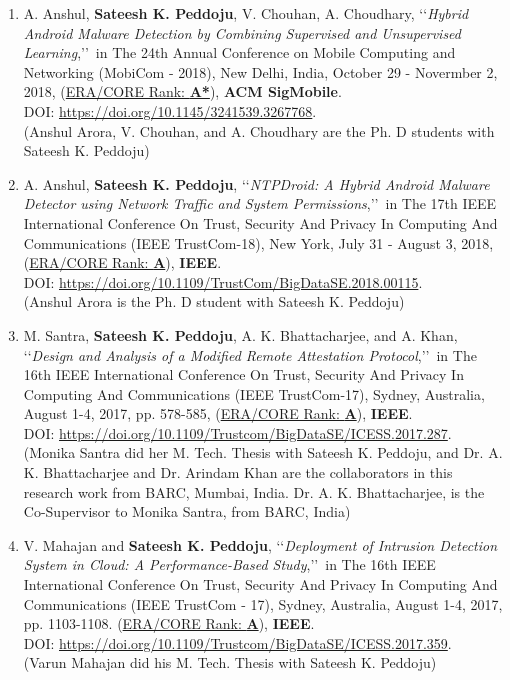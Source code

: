 \begin{enumerate}%
    
		\item
	A. Anshul, \textbf{Sateesh K. Peddoju}, V. Chouhan, A. Choudhary, \lq\lq \textit{Hybrid Android Malware Detection by Combining Supervised and Unsupervised Learning},\rq\rq\, in The 24th Annual Conference on Mobile Computing and Networking (MobiCom - 2018), New Delhi, India, October 29 - Novermber 2, 2018, (\underline{ERA/CORE Rank: \textbf{A*}}), \textbf{ACM SigMobile}. \\DOI: \url{https://doi.org/10.1145/3241539.3267768}. \\ (Anshul Arora, V. Chouhan, and A. Choudhary are the Ph. D students with Sateesh K. Peddoju)

	
	\item
	A. Anshul, \textbf{Sateesh K. Peddoju}, \lq\lq \textit{NTPDroid: A Hybrid Android Malware Detector using Network Traffic and System Permissions},\rq\rq\, in The 17th IEEE International Conference On Trust, Security And Privacy In Computing And Communications (IEEE TrustCom-18), New York, July 31 - August 3, 2018, (\underline{ERA/CORE Rank: \textbf{A}}), \textbf{IEEE}. \\DOI: \url{https://doi.org/10.1109/TrustCom/BigDataSE.2018.00115}. \\ (Anshul Arora is the Ph. D student with Sateesh K. Peddoju)
	
	\item
	M. Santra, \textbf{Sateesh K. Peddoju}, A. K. Bhattacharjee, and A. Khan, \lq\lq \textit{Design and Analysis of a Modified Remote Attestation Protocol},\rq\rq\, in The 16th IEEE International Conference On Trust, Security And Privacy In Computing And Communications (IEEE TrustCom-17), Sydney, Australia, August 1-4, 2017,  pp. 578-585, (\underline{ERA/CORE Rank: \textbf{A}}), \textbf{IEEE}. \\DOI: \url{https://doi.org/10.1109/Trustcom/BigDataSE/ICESS.2017.287}.	\\(Monika Santra did her M. Tech. Thesis with Sateesh K. Peddoju, and Dr. A. K. Bhattacharjee and Dr. Arindam Khan are the collaborators in this research work from BARC, Mumbai, India. Dr. A. K. Bhattacharjee, is the Co-Supervisor to Monika Santra, from BARC, India)

		
	\item
	V. Mahajan and \textbf{Sateesh K. Peddoju}, \lq\lq \textit{Deployment of Intrusion Detection System in Cloud: A Performance-Based Study},\rq\rq\,  in The 16th IEEE International Conference On Trust, Security And Privacy In Computing And Communications (IEEE TrustCom - 17), Sydney, Australia, August 1-4, 2017,  pp. 1103-1108. (\underline{ERA/CORE Rank: \textbf{A}}), \textbf{IEEE}. \\ DOI: \url{https://doi.org/10.1109/Trustcom/BigDataSE/ICESS.2017.359}. \\(Varun Mahajan did his M. Tech. Thesis with Sateesh K. Peddoju)


\end{enumerate}
